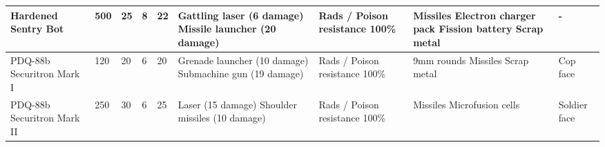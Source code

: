 \begin{longtable}{|p{2.3cm}|p{1cm}|p{1cm}|p{1cm}|p{1cm}|p{2.6cm}|p{2.6cm}|p{2.6cm}|p{2.6cm}|}
\hline
Hardened Sentry Bot & 500 & 25 & 8 & 22 & Gattling laser (6 damage) Missile launcher (20 damage) & Rads / Poison resistance 100\% & Missiles Electron charger pack Fission battery Scrap metal & - \\
\hline
PDQ-88b Securitron Mark I & 120 & 20 & 6 & 20 & Grenade launcher (10 damage) Submachine gun (19 damage) & Rads / Poison resistance 100\% & 9mm rounds Missiles Scrap metal & Cop face \\
\hline
PDQ-88b Securitron Mark II & 250 & 30 & 6 & 25 & Laser (15 damage) Shoulder missiles (10 damage) & Rads / Poison resistance 100\% & Missiles Microfusion cells & Soldier face \\
\hline
\end{longtable}
